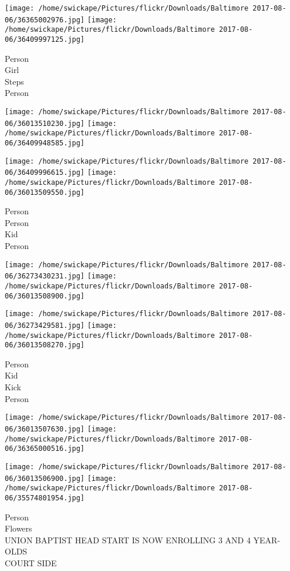 \documentclass[10pt,letterpaper]{article}
\begin{document}
\texttt{[image: /home/swickape/Pictures/flickr/Downloads/Baltimore 2017-08-06/36365002976.jpg]}
\texttt{[image: /home/swickape/Pictures/flickr/Downloads/Baltimore 2017-08-06/36409997125.jpg]}

Person\\
Girl\\
Steps\\
Person
\pagebreak

\texttt{[image: /home/swickape/Pictures/flickr/Downloads/Baltimore 2017-08-06/36013510230.jpg]}
\texttt{[image: /home/swickape/Pictures/flickr/Downloads/Baltimore 2017-08-06/36409948585.jpg]}

\texttt{[image: /home/swickape/Pictures/flickr/Downloads/Baltimore 2017-08-06/36409996615.jpg]}
\texttt{[image: /home/swickape/Pictures/flickr/Downloads/Baltimore 2017-08-06/36013509550.jpg]}

Person\\
Person\\
Kid\\
Person
\pagebreak

\texttt{[image: /home/swickape/Pictures/flickr/Downloads/Baltimore 2017-08-06/36273430231.jpg]}
\texttt{[image: /home/swickape/Pictures/flickr/Downloads/Baltimore 2017-08-06/36013508900.jpg]}

\texttt{[image: /home/swickape/Pictures/flickr/Downloads/Baltimore 2017-08-06/36273429581.jpg]}
\texttt{[image: /home/swickape/Pictures/flickr/Downloads/Baltimore 2017-08-06/36013508270.jpg]}

Person\\
Kid\\
Kick\\
Person
\pagebreak

\texttt{[image: /home/swickape/Pictures/flickr/Downloads/Baltimore 2017-08-06/36013507630.jpg]}
\texttt{[image: /home/swickape/Pictures/flickr/Downloads/Baltimore 2017-08-06/36365000516.jpg]}

\texttt{[image: /home/swickape/Pictures/flickr/Downloads/Baltimore 2017-08-06/36013506900.jpg]}
\texttt{[image: /home/swickape/Pictures/flickr/Downloads/Baltimore 2017-08-06/35574801954.jpg]}

Person\\
Flowers\\
UNION BAPTIST HEAD START IS NOW ENROLLING 3 AND 4 YEAR{-}OLDS\\
COURT SIDE
\pagebreak
\end{document}
